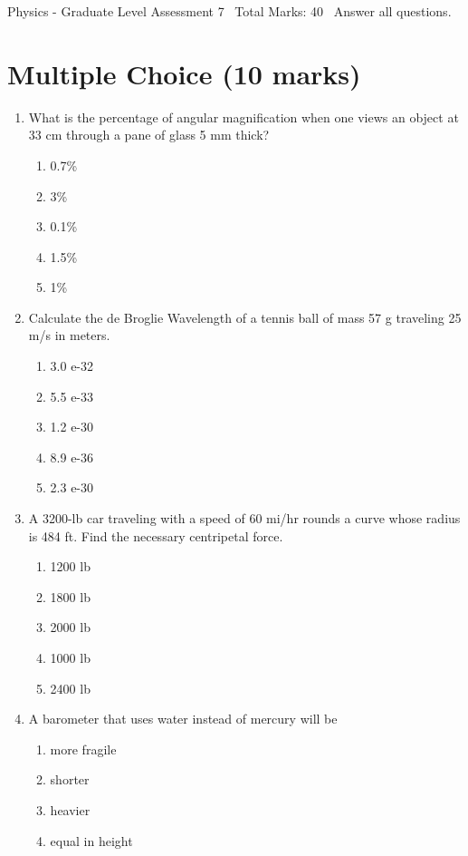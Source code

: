 \documentclass[12pt]{article}
\begin{document}
\begin{center}
Physics - Graduate Level Assessment 7 \
Total Marks: 40 \
Answer all questions.
\end{center}

\section*{Multiple Choice (10 marks)}
\begin{enumerate}[label=\arabic*.]
\item What is the percentage of angular magnification when one views an object at 33 cm through a pane of glass 5 mm thick?
\begin{enumerate}[label=(\alph*)]
    \item 0.7\%
    \item 3\%
    \item 0.1\%
    \item 1.5\%
    \item 1\%
\end{enumerate}
\item Calculate the de Broglie Wavelength of a tennis ball of mass 57 g traveling 25 m/s in meters.
\begin{enumerate}[label=(\alph*)]
    \item 3.0 e-32
    \item 5.5 e-33
    \item 1.2 e-30
    \item 8.9 e-36
    \item 2.3 e-30
\end{enumerate}
\item A 3200-lb car traveling with a speed of 60 mi/hr rounds a curve whose radius is 484 ft. Find the necessary centripetal force.
\begin{enumerate}[label=(\alph*)]
    \item 1200 lb
    \item 1800 lb
    \item 2000 lb
    \item 1000 lb
    \item 2400 lb
\end{enumerate}
\item A barometer that uses water instead of mercury will be
\begin{enumerate}[label=(\alph*)]
    \item more fragile
    \item shorter
    \item heavier
    \item equal in height

\end{enumerate}
\end{enumerate}
\end{document}
